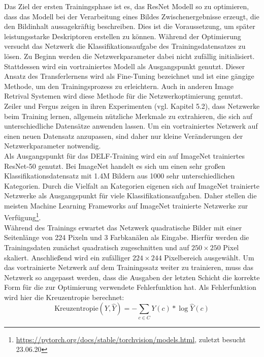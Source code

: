 Das Ziel der ersten Trainingsphase ist es, das ResNet Modell so zu optimieren, dass das Modell bei der Verarbeitung eines Bildes Zwischenergebnisse erzeugt, die den Bildinhalt aussagekräftig beschreiben. Dies ist die Voraussetzung, um später leistungsstarke Deskriptoren erstellen zu können. Während der Optimierung versucht das Netzwerk die Klassifikationsaufgabe des Trainingsdatensatzes zu lösen. Zu Beginn werden die Netzwerkparameter dabei nicht zufällig initialisiert. Stattdessen wird ein vortrainiertes Modell als Ausgangspunkt genutzt. Dieser Ansatz des Transferlernens wird als Fine-Tuning bezeichnet und ist eine gängige Methode, um den Trainingsprozess zu erleichtern. Auch in anderen Image Retrival Systemen \cite{convnet} \cite{siamac_contrastive_loss} wird diese Methode für die Netzwerkoptimierung genutzt. Zeiler und Fergus zeigen in ihren Experimenten (vgl. \cite{extraction_point_meaning} Kapitel 5.2), dass Netzwerke beim Training lernen, allgemein nützliche Merkmale zu extrahieren, die sich auf unterschiedliche Datensätze anwenden lassen. Um ein vortrainiertes Netzwerk auf einen neuen Datensatz anzupassen, sind daher nur kleine Veränderungen der Netzwerkparameter notwendig.
\\
Als Ausgangspunkt für das DELF-Training wird ein auf ImageNet trainiertes ResNet-50 genutzt. Bei ImageNet handelt es sich um einen sehr großen Klassifikationsdatensatz mit 1.4M Bildern aus 1000 sehr unterschiedlichen Kategorien. Durch die Vielfalt an Kategorien eigenen sich auf ImageNet trainierte Netzwerke als Ausgangspunkt für viele Klassifikationsaufgaben. Daher stellen die meisten Machine Learning Frameworks auf ImageNet trainierte Netzwerke zur Verfügung\footnote{\url{https://pytorch.org/docs/stable/torchvision/models.html}, zuletzt besucht 23.06.20}. 
\\
Während des Trainings erwartet das Netzwerk quadratische Bilder mit einer Seitenlänge von 224 Pixeln und 3 Farbkanälen als Eingabe. Hierfür werden die Trainingsdaten zunächst quadratisch zugeschnitten und auf $250\times250$ Pixel skaliert. Anschließend wird ein zufälliger $224\times244$ Pixelbereich ausgewählt.
Um das vortrainierte Netzwerk auf dem Trainingssatz weiter zu trainieren, muss das Netzwerk so angepasst werden, dass die Ausgaben der letzten Schicht die korrekte Form für die zur Optimierung verwendete Fehlerfunktion hat. Als Fehlerfunktion wird hier die Kreuzentropie berechnet:
\begin{equation}
\text{Kreuzentropie}(Y,\hat{Y}) = -\sum_{c \in C}{Y(c)*\log\hat{Y}(c)}
\end{equation}
